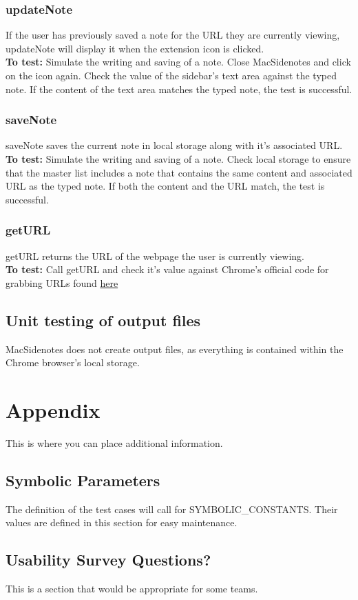 \documentclass[12pt, titlepage]{article}
\begin{document}
\subsubsection{updateNote}
	If the user has previously saved a note for the URL they are currently 
	viewing, updateNote will display it when the extension icon is clicked.\\
	\textbf{To test:} Simulate the writing and saving of a note. Close 
	MacSidenotes and 
	click on the icon again. Check the value of the sidebar's text area against 
	the typed note. If the content of the text area matches the typed note, the 
	test is successful.
\subsubsection{saveNote}
	saveNote saves the current note in local storage along with it's associated 
	URL.\\
	\textbf{To test:} Simulate the writing and saving of a note. Check local 
	storage to ensure that the master list includes a note that contains the 
	same content and associated URL as the typed note. If both the content and 
	the URL match, the test is successful.
\subsubsection{getURL}
	getURL returns the URL of the webpage the user is currently viewing.\\
	\textbf{To test:} Call getURL and check it's value against Chrome's 
	official code for grabbing URLs found 
	\href{https://developer.chrome.com/extensions/tabs}{here} 

\subsection{Unit testing of output files}		

MacSidenotes does not create output files, as everything is contained within 
the Chrome browser's local storage.





\newpage

\section{Appendix}

This is where you can place additional information.

\subsection{Symbolic Parameters}

The definition of the test cases will call for SYMBOLIC\_CONSTANTS.
Their values are defined in this section for easy maintenance.

\subsection{Usability Survey Questions?}

This is a section that would be appropriate for some teams.
\end{document}

